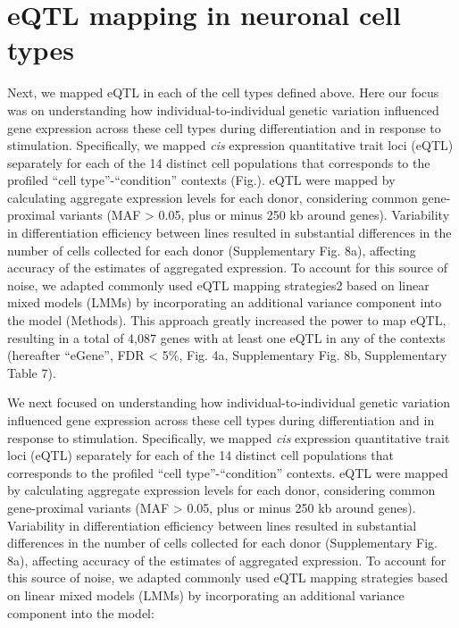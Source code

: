 \section{eQTL mapping in neuronal cell types}

Next, we mapped eQTL in each of the cell types defined above.
Here our focus was on understanding how individual-to-individual genetic variation influenced gene expression across these cell types during differentiation and in response to stimulation.
Specifically, we mapped \textit{cis} expression quantitative trait loci (eQTL) separately for each of the 14 distinct cell populations that corresponds to the profiled “cell type”-“condition” contexts (Fig.). 
eQTL were mapped by calculating aggregate expression levels for each donor, considering common gene-proximal variants (MAF > 0.05, plus or minus 250 kb around genes). 
Variability in differentiation efficiency between lines resulted in substantial differences in the number of cells collected for each donor (Supplementary Fig. 8a), affecting accuracy of the estimates of aggregated expression. 
To account for this source of noise, we adapted commonly used eQTL mapping strategies2 based on linear mixed models (LMMs) by incorporating an additional variance component into the model (Methods). 
This approach greatly increased the power to map eQTL, resulting in a total of 4,087 genes with at least one eQTL in any of the contexts (hereafter “eGene”, FDR < 5\%, Fig. 4a, Supplementary Fig. 8b, Supplementary Table 7).

We next focused on understanding how individual-to-individual genetic variation influenced gene expression across these cell types during differentiation and in response to stimulation.
Specifically, we mapped \textit{cis} expression quantitative trait loci (eQTL) separately for each of the 14 distinct cell populations that corresponds to the profiled “cell type”-“condition” contexts. 
eQTL were mapped by calculating aggregate expression levels for each donor, considering common gene-proximal variants (MAF > 0.05, plus or minus 250 kb around
genes). 
Variability in differentiation efficiency between lines resulted in substantial differences in the number of cells collected for each donor (Supplementary Fig. 8a),
affecting accuracy of the estimates of aggregated expression. 
To account for this source of noise, we adapted commonly used eQTL mapping strategies \cite{cuomo2020single} based on linear mixed models (LMMs) by incorporating an additional variance component into the model:

